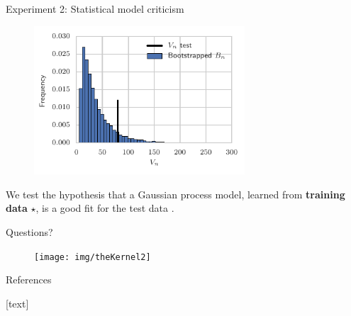 \documentclass{beamer}
\begin{document}
   \begin{frame}{Experiment 2: Statistical model criticism}
        \begin{figure}
           \includegraphics[width=0.7\textwidth]{img/gp_regression_bootstrap_hist} 
        \end{figure}
We test the hypothesis that a Gaussian process {\color{red} model}, learned from \textbf{training data} $\star$, is a good fit for the {\color{blue} test data} \cite{lloyd2015statistical}.

   \end{frame}

   \begin{frame}{Questions?}
      \begin{figure}
\texttt{[image: img/theKernel2]} %
        \end{figure}   
   \end{frame}


   \begin{frame}{References}


\begin{minipage}{.9\linewidth}
{\tiny
[text] 
 
\tiny
 
} 
\end{minipage}
\end{frame}
\end{document}
